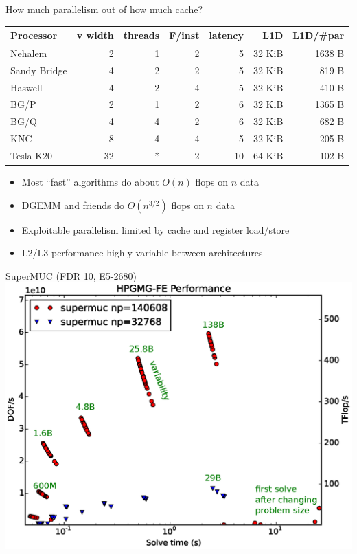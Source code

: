 \documentclass{beamer}
\begin{document}
\begin{frame}{How much parallelism out of how much cache?}
  \begin{tabular}{l rrrr rr}
    \toprule
    Processor & v width & threads & F/inst & latency & L1D & L1D/\#par \\
    \midrule
    Nehalem & 2 & 1 & 2 & 5 & 32 KiB & 1638 B \\
    Sandy Bridge & 4 & 2 & 2 & 5 & 32 KiB & 819 B \\
    Haswell & 4 & 2 & 4 & 5 & 32 KiB & 410 B \\
    BG/P & 2 & 1 & 2 & 6 & 32 KiB & 1365 B \\
    BG/Q & 4 & 4 & 2 & 6 & 32 KiB & 682 B \\
    KNC & 8 & 4 & 4 & 5 & 32 KiB & 205 B \\
    Tesla K20 & 32 & * & 2 & 10 & 64 KiB & 102 B \\
    \bottomrule
  \end{tabular}
  \begin{itemize}
  \item Most ``fast'' algorithms do about $O(n)$ flops on $n$ data
  \item DGEMM and friends do $O(n^{3/2})$ flops on $n$ data
  \item Exploitable parallelism limited by cache and register load/store
  \item L2/L3 performance highly variable between architectures
  \end{itemize}
\end{frame}

\begin{frame}{SuperMUC (FDR 10, E5-2680)}
  \includegraphics[width=\textwidth]{figures/hpgmg/range-supermuc-ann.eps}
\end{frame}
\end{document}
